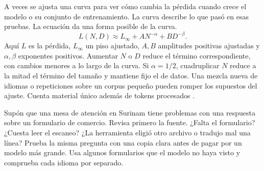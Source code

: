 {A veces se ajusta una curva para ver cómo cambia la pérdida cuando crece el modelo o su conjunto de entrenamiento. La curva describe lo que pasó en esas pruebas. La ecuación da una forma posible de la curva.}
\begin{equation}
 L(N,D)\approx L_\infty + A N^{-\alpha}+B D^{-\beta}.
 \label{eq:scaling}
\end{equation}
{Aquí \(L\) es la pérdida, \(L_\infty\) un piso ajustado, \(A,B\) amplitudes positivas ajustadas y \(\alpha,\beta\) exponentes positivos. Aumentar \(N\) o \(D\) reduce el término correspondiente, con cambios menores a lo largo de la curva. Si \(\alpha=1/2\), cuadruplicar \(N\) reduce a la mitad el término del tamaño y mantiene fijo el de datos. Una mezcla nueva de idiomas o repeticiones sobre un corpus pequeño pueden romper los supuestos del ajuste. Cuenta material único además de tokens procesados \citep{hoffmann}.}

{Supón que una mesa de atención en Surinam tiene problemas con una respuesta sobre un formulario de comercio. Revisa primero la fuente. ¿Falta el formulario? ¿Cuesta leer el escaneo? ¿La herramienta eligió otro archivo o tradujo mal una línea? Prueba la misma pregunta con una copia clara antes de pagar por un modelo más grande. Usa algunos formularios que el modelo no haya visto y comprueba cada idioma por separado.}

\section{}

